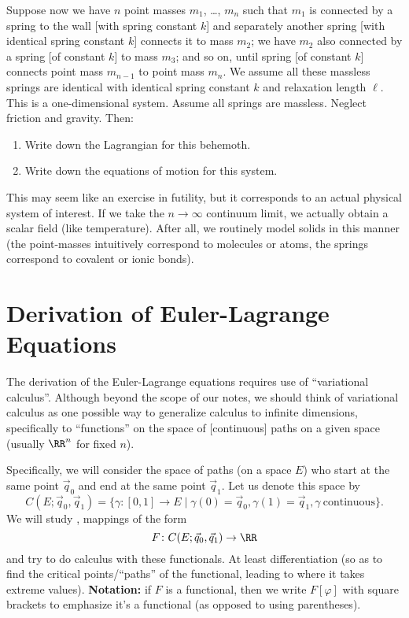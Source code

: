 \begin{exercise}
Suppose now we have $n$ point masses $m_{1}$, \dots, $m_{n}$ such that
$m_{1}$ is connected by a spring to the wall [with spring constant
$k$] and separately another spring [with identical spring constant $k$] connects
it to mass $m_{2}$; we have $m_{2}$ also connected by a spring [of
constant $k$] to mass $m_{3}$; and so on, until spring [of constant $k$]
connects point mass $m_{n-1}$ to point mass $m_{n}$. We assume all these
massless springs are identical with identical spring constant $k$ and
relaxation length $\ell$. This is a one-dimensional system. Assume all
springs are massless. Neglect friction and gravity. Then:
\begin{enumerate}
\item Write down the Lagrangian for this behemoth.
\item Write down the equations of motion for this system.
\end{enumerate}
\end{exercise}

\begin{remark}
This may seem like an exercise in futility, but it corresponds to an
actual physical system of interest. If we take the $n\to\infty$
continuum limit, we actually obtain a scalar field (like temperature).
After all, we routinely model solids in this manner (the point-masses
intuitively correspond to molecules or atoms, the springs correspond to
covalent or ionic bonds).
\end{remark}

\section{Derivation of Euler-Lagrange Equations}

\M
The derivation of the Euler-Lagrange equations requires use of
``variational calculus''. Although beyond the scope of our notes, we
should think of variational calculus as one possible way to generalize
calculus to infinite dimensions, specifically to ``functions'' on the
space of [continuous] paths on a given space (usually $\RR^{n}$ for
fixed $n$).

Specifically, we will consider the space of paths (on a space $E$) who
start at the same point $\vec{q}_{0}$ and end at the same point
$\vec{q}_{1}$. Let us denote this space by
\begin{equation}
C(E; \vec{q}_{0},\vec{q}_{1}) = \{\gamma\colon[0,1]\to E\mid\gamma(0)=\vec{q}_{0},\gamma(1)=\vec{q}_{1},\gamma~\mbox{continuous}\}.
\end{equation}
We will study , mappings of the form
\begin{equation}
F\colon C(E; \vec{q}_{0},\vec{q}_{1})\to\RR
\end{equation}
and try to do calculus with these functionals. At least differentiation
(so as to find the critical points/``paths'' of the functional, leading
to where it takes extreme values). \textbf{Notation:} if $F$ is a
functional, then we write $F[\varphi]$ with square brackets to emphasize
it's a functional (as opposed to using parentheses).

